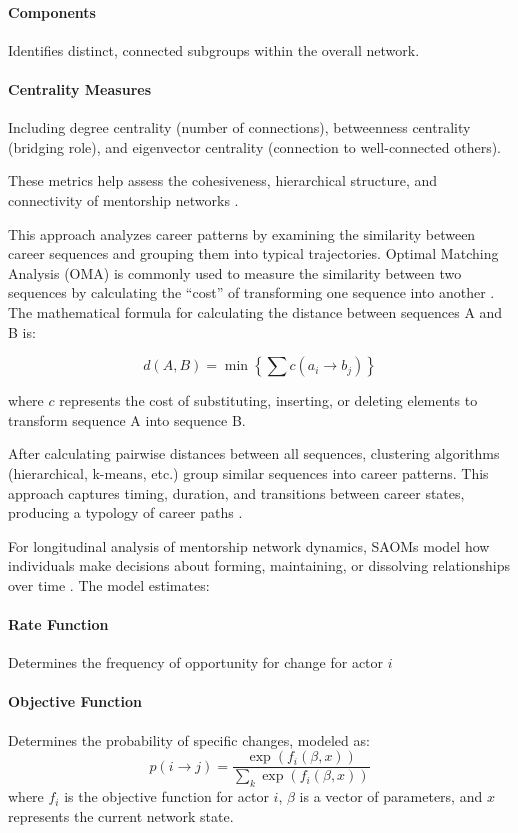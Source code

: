 \documentclass[main.tex]{subfiles}
\begin{document}
\paragraph{Components} Identifies distinct, connected subgroups within the overall network.

\paragraph{Centrality Measures} Including degree centrality (number of connections), betweenness centrality (bridging role), and eigenvector centrality (connection to well-connected others).

These metrics help assess the cohesiveness, hierarchical structure, and connectivity of mentorship networks \parencite{cdc2015network}.

This approach analyzes career patterns by examining the similarity between career sequences and grouping them into typical trajectories. Optimal Matching Analysis (OMA) is commonly used to measure the similarity between two sequences by calculating the ``cost'' of transforming one sequence into another \parencite{pmc2015mapping}. The mathematical formula for calculating the distance between sequences A and B is:

\[ d(A,B) = \min\left\{\sum c(a_i \rightarrow b_j)\right\} \]

where \( c \) represents the cost of substituting, inserting, or deleting elements to transform sequence A into sequence B.

After calculating pairwise distances between all sequences, clustering algorithms (hierarchical, k-means, etc.) group similar sequences into career patterns. This approach captures timing, duration, and transitions between career states, producing a typology of career paths \parencite{misq2008career, pmc2015mapping}.

For longitudinal analysis of mentorship network dynamics, SAOMs model how individuals make decisions about forming, maintaining, or dissolving relationships over time \parencite{oxford2012siena}. The model estimates:

\paragraph{Rate Function} Determines the frequency of opportunity for change for actor \( i \)

\paragraph{Objective Function} Determines the probability of specific changes, modeled as:
\[ p(i \rightarrow j) = \frac{\exp(f_i(\beta,x))}{\sum_k \exp(f_i(\beta,x))} \]
where \( f_i \) is the objective function for actor \( i \), \( \beta \) is a vector of parameters, and \( x \) represents the current network state.
\end{document}

